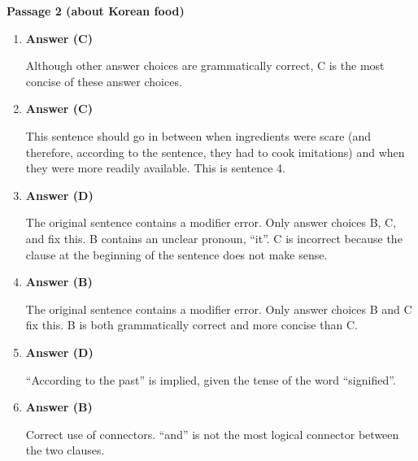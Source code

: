 
\textbf{Passage 2 (about Korean food)}

\begin{enumerate}
\item \textbf{Answer (C)}

Although other answer choices are grammatically correct, C is the most concise of these answer choices.  

\item \textbf{Answer (C)}

This sentence should go in between when ingredients were scare (and therefore, according to the sentence, they had to cook imitations) and when they were more readily available. This is sentence 4. 

\item \textbf{Answer (D)}

The original sentence contains a modifier error. Only answer choices B, C, and fix this. B contains an unclear pronoun, ``it''. C is incorrect because the clause at the beginning of the sentence does not make sense. 

\item \textbf{Answer (B)}

The original sentence contains a modifier error. Only answer choices B and C fix this. B is both grammatically correct and more concise than C. 

\item \textbf{Answer (D)}

``According to the past'' is implied, given the tense of the word ``signified''. 

\item \textbf{Answer (B)}

Correct use of connectors. ``and'' is not the most logical connector between the two clauses. 
\end{enumerate}